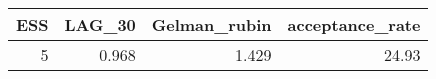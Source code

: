 \begin{longtable}{rrrr}
\toprule
ESS & LAG\_30 & Gelman\_rubin & acceptance\_rate \\ 
\midrule
5 & 0.968 & 1.429 & 24.93 \\ 
\bottomrule
\end{longtable}

